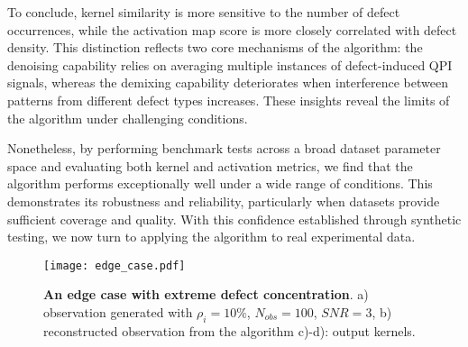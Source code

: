 To conclude, kernel similarity is more sensitive to the number of defect occurrences, while the activation map score is more closely correlated with defect density. This distinction reflects two core mechanisms of the algorithm: the denoising capability relies on averaging multiple instances of defect-induced QPI signals, whereas the demixing capability deteriorates when interference between patterns from different defect types increases. These insights reveal the limits of the algorithm under challenging conditions.

Nonetheless, by performing benchmark tests across a broad dataset parameter space and evaluating both kernel and activation metrics, we find that the algorithm performs exceptionally well under a wide range of conditions. This demonstrates its robustness and reliability, particularly when datasets provide sufficient coverage and quality. With this confidence established through synthetic testing, we now turn to applying the algorithm to real experimental data.

\begin{figure}
	\texttt{[image: edge\_case.pdf]} 
	\centering
	\caption[\textbf{An edge case with extreme defect concentration}]{\textbf{An edge case with extreme defect concentration}. a) observation generated with $\rho_i = 10\%$, $N_{obs}=100$, $SNR=3$, b) reconstructed observation from the algorithm c)-d): output kernels.}
	\label{fig:edge_case}
\end{figure}

